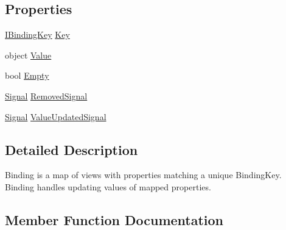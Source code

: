 \subsection*{Properties}
\begin{DoxyCompactItemize}
\item 
\mbox{\hyperlink{interfacecp_games_1_1core_1_1_rapid_m_v_c_1_1_i_binding_key}{I\+Binding\+Key}} \mbox{\hyperlink{interfacecp_games_1_1core_1_1_rapid_m_v_c_1_1_i_binding_aa61ee9cd1b44e221f1ae28f9552792c7}{Key}}
\item 
object \mbox{\hyperlink{interfacecp_games_1_1core_1_1_rapid_m_v_c_1_1_i_binding_a7ec4a6dc07e378d9ffd775b4d6b387f7}{Value}}
\item 
bool \mbox{\hyperlink{interfacecp_games_1_1core_1_1_rapid_m_v_c_1_1_i_binding_ad4ea0596cb7a0ef820717785e1e5a4ef}{Empty}}
\item 
\mbox{\hyperlink{classcp_games_1_1core_1_1_rapid_m_v_c_1_1_signal}{Signal}} \mbox{\hyperlink{interfacecp_games_1_1core_1_1_rapid_m_v_c_1_1_i_binding_afc250797ed507d05b9b611f4d63cd345}{Removed\+Signal}}
\item 
\mbox{\hyperlink{classcp_games_1_1core_1_1_rapid_m_v_c_1_1_signal}{Signal}} \mbox{\hyperlink{interfacecp_games_1_1core_1_1_rapid_m_v_c_1_1_i_binding_a24032f62e91ba7f08581be9afd09b2c7}{Value\+Updated\+Signal}}
\end{DoxyCompactItemize}


\subsection{Detailed Description}
Binding is a map of views with properties matching a unique Binding\+Key. Binding handles updating values of mapped properties. 



\subsection{Member Function Documentation}
\mbox{\label{interfacecp_games_1_1core_1_1_rapid_m_v_c_1_1_i_binding_a600504a6b8ba86a81e02ef03c4dc9e53}} 
